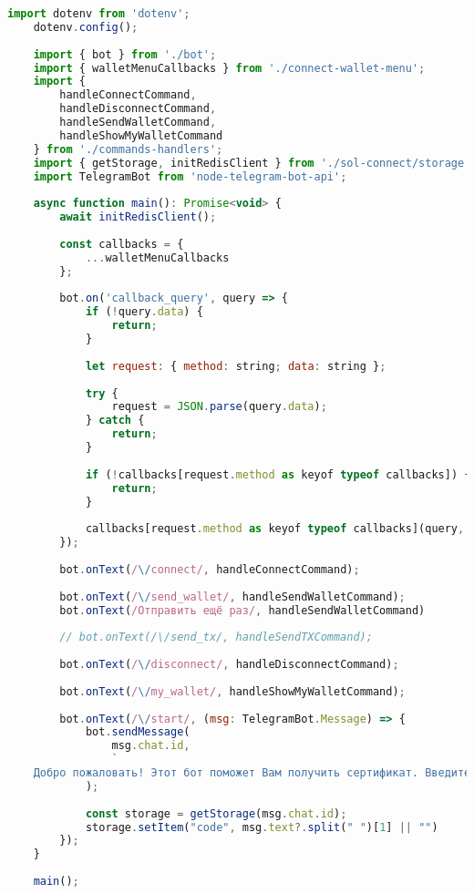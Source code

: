 \begin{lstlisting}[label=lst:user_client, language=JavaScript, caption=Ядро бота]
    import dotenv from 'dotenv';
    dotenv.config();
    
    import { bot } from './bot';
    import { walletMenuCallbacks } from './connect-wallet-menu';
    import {
        handleConnectCommand,
        handleDisconnectCommand,
        handleSendWalletCommand,
        handleShowMyWalletCommand
    } from './commands-handlers';
    import { getStorage, initRedisClient } from './sol-connect/storage';
    import TelegramBot from 'node-telegram-bot-api';
    
    async function main(): Promise<void> {
        await initRedisClient();
    
        const callbacks = {
            ...walletMenuCallbacks
        };
    
        bot.on('callback_query', query => {
            if (!query.data) {
                return;
            }
    
            let request: { method: string; data: string };
    
            try {
                request = JSON.parse(query.data);
            } catch {
                return;
            }
    
            if (!callbacks[request.method as keyof typeof callbacks]) {
                return;
            }
    
            callbacks[request.method as keyof typeof callbacks](query, request.data);
        });
    
        bot.onText(/\/connect/, handleConnectCommand);
    
        bot.onText(/\/send_wallet/, handleSendWalletCommand);
        bot.onText(/Отправить ещё раз/, handleSendWalletCommand)
    
        // bot.onText(/\/send_tx/, handleSendTXCommand);
    
        bot.onText(/\/disconnect/, handleDisconnectCommand);
    
        bot.onText(/\/my_wallet/, handleShowMyWalletCommand);
    
        bot.onText(/\/start/, (msg: TelegramBot.Message) => {
            bot.sendMessage(
                msg.chat.id,
                `
    Добро пожаловать! Этот бот поможет Вам получить сертификат. Введите команду /connect, чтобы начать.`
            );
    
            const storage = getStorage(msg.chat.id);
            storage.setItem("code", msg.text?.split(" ")[1] || "")
        });
    }
    
    main();
    
\end{lstlisting}